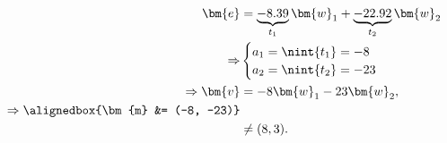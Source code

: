 \documentclass[
  coursecode={MTHE 418},
  assignmentname={Homework \homeworknumber},
  studentnumber=20053722,
  name={Bryan Hoang},
  draft,
]{
  ltxanswer%
}
\begin{document}
\begin{questions}
\begin{parts}
      \part{}
      \begin{solution}
        \begin{align*}
          \bm{e}                         &= \underbrace{-8.39}_{t_{1}} \bm{w}_{1} + \underbrace{-22.92}_{t_{2}} \bm{w}_{2} \\
          \Rightarrow                    &\begin{cases}
                                            a_{1} = \nint{t_{1}} = -8 \\
                                            a_{2} = \nint{t_{2}} = -23
                                          \end{cases}                                \\
          \Rightarrow \bm{v}             &= - 8 \bm{w}_{1} - 23 \bm{w}_{2},                                                \\
          \Rightarrow \alignedbox{\bm{m} &= (-8, -23)}                                                                     \\
                                         &\ne (8, 3).
        \end{align*}
      \end{solution}
    \end{parts}
  \end{questions}
\end{document}
